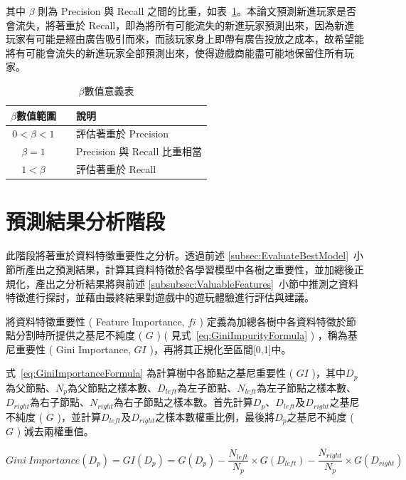 其中 $\beta$ 則為 Precision 與 Recall 之間的比重，如表~\ref{tab:beta}。本論文預測新進玩家是否會流失，將著重於 Recall，即為將所有可能流失的新進玩家預測出來，因為新進玩家有可能是經由廣告吸引而來，而該玩家身上即帶有廣告投放之成本，故希望能將有可能會流失的新進玩家全部預測出來，使得遊戲商能盡可能地保留住所有玩家。

\begin{table}[!htb]
	\centering
	\begin{tabular}{ccl}
		\hline \hline
		$\beta$數值範圍 && 說明 \\
    \hline \hline
    $0 < \beta < 1$ && 評估著重於 Precision \\
    \hline
    $\beta = 1$ && Precision 與 Recall 比重相當 \\
    \hline
    $1 < \beta$ && 評估著重於 Recall \\
    \hline \hline
		\end{tabular}
	\caption[$\beta$數值意義表]{$\beta$數值意義表}
	\label{tab:beta}
\end{table}

\section{預測結果分析階段}

此階段將著重於資料特徵重要性之分析。透過前述 \ref{subsec:EvaluateBestModel}~小節所產出之預測結果，計算其資料特徵於各學習模型中各樹之重要性，並加總後正規化，產出之分析結果將與前述 \ref{subsubsec:ValuableFeatures}~小節中推測之資料特徵進行探討，並藉由最終結果對遊戲中的遊玩體驗進行評估與建議。

將資料特徵重要性 ( Feature Importance, $fi$ ) 定義為加總各樹中各資料特徵於節點分割時所提供之基尼不純度 ( $G$ ) ( 見式~\ref{eq:GiniImpurityFormula} ) ，稱為基尼重要性 ( Gini Importance, $GI$ )，再將其正規化至區間[0,1]中。

式~\ref{eq:GiniImportanceFormula} 為計算樹中各節點之基尼重要性 ( $GI$ )，其中$D_p$為父節點、$N_p$為父節點之樣本數、$D_{left}$為左子節點、$N_{left}$為左子節點之樣本數、$D_{right}$為右子節點、$N_{right}$為右子節點之樣本數。首先計算$D_p$、$D_{left}$及$D_{right}$之基尼不純度 ( $G$ )，並計算$D_{left}$及$D_{right}$之樣本數權重比例，最後將$D_p$之基尼不純度 ( $G$ ) 減去兩權重值。

\begin{equation}
  \label{eq:GiniImportanceFormula}
  Gini\ Importance(D_p) = GI(D_p) = G(D_p) - \frac{N_{left}}{N_p} \times G(D_{left}) - \frac{N_{right}}{N_p} \times G(D_{right})
\end{equation}

